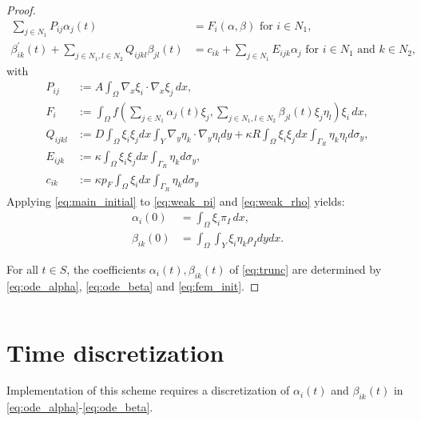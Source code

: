 \documentclass{article}
\begin{document}
\begin{proof}
    \begin{align}
        \sum_{j\in N_1} P_{ij} \alpha_j(t) &= F_i(\alpha,\beta)\label{eq:ode_alpha} \mbox{ for }i\in N_1,\\
        \beta^\prime_{ik}(t) + \sum_{j\in N_1,l\in N_2} Q_{ijkl} \beta_{jl}(t) &= c_{ik} + \sum_{j\in N_1} E_{ijk}\alpha_j\label{eq:ode_beta}\mbox{ for }i\in N_1\mbox{ and }k \in N_2,
    \end{align}
    with
    \begin{equation}
        \begin{split}
            P_{ij} &:= A \int_\Omega \nabla_x \xi_i \cdot \nabla_x \xi_j\,dx,\\
            F_i &:= \int_\Omega f \left( \sum_{j\in N_1}\alpha_j(t) \xi_j,\sum_{j\in N_1,l\in N_2}\beta_{jl}(t)\xi_j\eta_l \right)\xi_i\,dx,\\
            Q_{ijkl} &:= D \int_\Omega \xi_i\xi_jdx\int_{Y} \nabla_y \eta_k\cdot \nabla_y \eta_ldy + \kappa R\int_\Omega \xi_i\xi_j dx\int_{\Gamma_R}\eta_k \eta_ld\sigma_y,\\
            E_{ijk} &:= \kappa\int_\Omega\xi_i\xi_j dx\int_{\Gamma_R} \eta_kd\sigma_y,\\
            c_{ik}&:= \kappa p_F\int_\Omega \xi_i dx\int_{\Gamma_R} \eta_k d\sigma_y\,
        \end{split}
        \label{eq:matrices}
    \end{equation}
    Applying \eqref{eq:main_initial} to \eqref{eq:weak_pi} and \eqref{eq:weak_rho} yields:
    \begin{equation}
        \begin{split}
            \alpha_i(0) &= \int_\Omega \xi_i\pi_I\,dx,\\
            \beta_{ik}(0) &= \int_\Omega\int_Y\xi_i\eta_k\rho_Idydx.
        \end{split}
        \label{eq:fem_init}
    \end{equation}

    For all $t \in S$, the coefficients $\alpha_i(t), \beta_{ik}(t)$ of \eqref{eq:trunc} are determined by \eqref{eq:ode_alpha}, \eqref{eq:ode_beta} and \eqref{eq:fem_init}.
\end{proof}

\begin{equation}\end{equation}

\section{Time discretization}
\label{sec:time}
Implementation of this scheme requires a discretization of $\alpha_i(t)$ and $\beta_{ik}(t)$ in \eqref{eq:ode_alpha}-\eqref{eq:ode_beta}.
\end{document}
